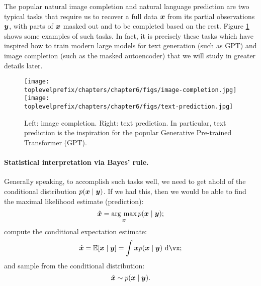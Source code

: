 \documentclass[../../book-main.tex]{subfiles}
\begin{document}
\begin{example}
The popular natural image completion and natural language prediction are two typical tasks that require us to recover a full data $\bm{x}$ from its partial observations $\bm{y}$, with parts of $\bm{x}$ masked out and to be completed based on the rest. Figure \ref{fig:image-text-completion} shows some examples of such tasks. In fact, it is precisely these tasks which have inspired how to train modern large models for text generation (such as GPT) and image completion (such as the masked autoencoder) that we will study in greater details later.
    \begin{figure}
        \centering
        \texttt{[image: \\toplevelprefix/chapters/chapter6/figs/image-completion.jpg]} \hspace{10mm} \texttt{[image: \\toplevelprefix/chapters/chapter6/figs/text-prediction.jpg]}
        \caption{Left: image completion. Right: text prediction. In particular, text prediction is the inspiration for the popular Generative Pre-trained Transformer (GPT).}
        \label{fig:image-text-completion}
    \end{figure}
\end{example}


\paragraph{Statistical interpretation via Bayes' rule.} Generally speaking, to accomplish such tasks well, we need to get ahold of the conditional distribution $p(\bm{x}\mid \bm{y})$. If we had this, then we would be able to find the maximal likelihood estimate (prediction): 
\begin{equation}
  \hat{\bm{x}} = \operatorname*{arg\ max}_{\bm{x}} p(\bm{x}\mid \bm{y});
\end{equation}
compute the conditional expectation estimate: 
\begin{equation}
  \hat{\x} = \mathbb{E}[\x \mid \y] = \int \x p(\x\mid \y)\odif{\vx};
\end{equation}
and sample from the conditional distribution:  
\begin{equation}
  \hat{\bm{x}} \sim p(\bm{x} \mid \bm{y}).
\end{equation}
\end{document}
